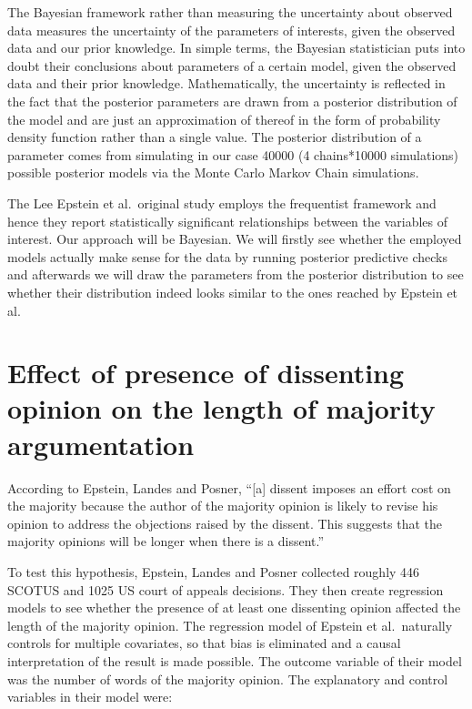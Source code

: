 \documentclass[
  11pt,
]{article}
\begin{document}
The Bayesian framework rather than measuring the uncertainty about
observed data measures the uncertainty of the parameters of interests,
given the observed data and our prior knowledge. In simple terms, the
Bayesian statistician puts into doubt their conclusions about parameters
of a certain model, given the observed data and their prior knowledge.
Mathematically, the uncertainty is reflected in the fact that the
posterior parameters are drawn from a posterior distribution of the
model and are just an approximation of thereof in the form of
probability density function rather than a single value. The posterior
distribution of a parameter comes from simulating in our case 40000 (4
chains*10000 simulations) possible posterior models via the Monte Carlo
Markov Chain simulations.

The Lee Epstein et al.~original study employs the frequentist framework
and hence they report statistically significant relationships between
the variables of interest. Our approach will be Bayesian. We will
firstly see whether the employed models actually make sense for the data
by running posterior predictive checks and afterwards we will draw the
parameters from the posterior distribution to see whether their
distribution indeed looks similar to the ones reached by Epstein et al.

\hypertarget{effect-of-presence-of-dissenting-opinion-on-the-length-of-majority-argumentation}{%
\section{Effect of presence of dissenting opinion on the length of
majority
argumentation}\label{effect-of-presence-of-dissenting-opinion-on-the-length-of-majority-argumentation}}

According to Epstein, Landes and Posner, ``{[}a{]} dissent imposes an
effort cost on the majority because the author of the majority opinion
is likely to revise his opinion to address the objections raised by the
dissent. This suggests that the majority opinions will be longer when
there is a dissent.''

To test this hypothesis, Epstein, Landes and Posner collected roughly
446 SCOTUS and 1025 US court of appeals decisions. They then create
regression models to see whether the presence of at least one dissenting
opinion affected the length of the majority opinion. The regression
model of Epstein et al.~naturally controls for multiple covariates, so
that bias is eliminated and a causal interpretation of the result is
made possible. The outcome variable of their model was the number of
words of the majority opinion. The explanatory and control variables in
their model were:
\end{document}

